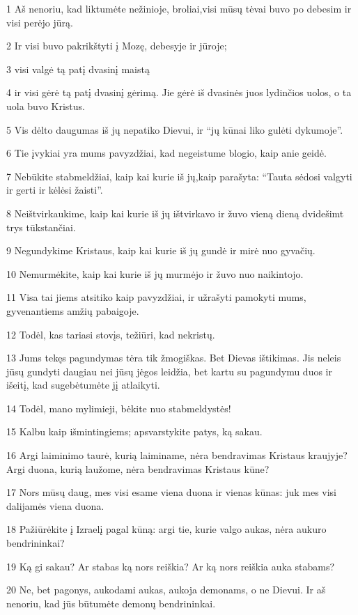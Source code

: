 \par 1 Aš nenoriu, kad liktumėte nežinioje, broliai,­visi mūsų tėvai buvo po debesim ir visi perėjo jūrą. 
\par 2 Ir visi buvo pakrikštyti į Mozę, debesyje ir jūroje; 
\par 3 visi valgė tą patį dvasinį maistą 
\par 4 ir visi gėrė tą patį dvasinį gėrimą. Jie gėrė iš dvasinės juos lydinčios uolos, o ta uola buvo Kristus. 
\par 5 Vis dėlto daugumas iš jų nepatiko Dievui, ir “jų kūnai liko gulėti dykumoje”. 
\par 6 Tie įvykiai yra mums pavyzdžiai, kad negeistume blogio, kaip anie geidė. 
\par 7 Nebūkite stabmeldžiai, kaip kai kurie iš jų,­kaip parašyta: “Tauta sėdosi valgyti ir gerti ir kėlėsi žaisti”. 
\par 8 Neištvirkaukime, kaip kai kurie iš jų ištvirkavo ir žuvo vieną dieną dvidešimt trys tūkstančiai. 
\par 9 Negundykime Kristaus, kaip kai kurie iš jų gundė ir mirė nuo gyvačių. 
\par 10 Nemurmėkite, kaip kai kurie iš jų murmėjo ir žuvo nuo naikintojo. 
\par 11 Visa tai jiems atsitiko kaip pavyzdžiai, ir užrašyti pamokyti mums, gyvenantiems amžių pabaigoje. 
\par 12 Todėl, kas tariasi stovįs, težiūri, kad nekristų. 
\par 13 Jums tekęs pagundymas tėra tik žmogiškas. Bet Dievas ištikimas. Jis neleis jūsų gundyti daugiau nei jūsų jėgos leidžia, bet kartu su pagundymu duos ir išeitį, kad sugebėtumėte jį atlaikyti. 
\par 14 Todėl, mano mylimieji, bėkite nuo stabmeldystės! 
\par 15 Kalbu kaip išmintingiems; apsvarstykite patys, ką sakau. 
\par 16 Argi laiminimo taurė, kurią laiminame, nėra bendravimas Kristaus kraujyje? Argi duona, kurią laužome, nėra bendravimas Kristaus kūne? 
\par 17 Nors mūsų daug, mes visi esame viena duona ir vienas kūnas: juk mes visi dalijamės viena duona. 
\par 18 Pažiūrėkite į Izraelį pagal kūną: argi tie, kurie valgo aukas, nėra aukuro bendrininkai? 
\par 19 Ką gi sakau? Ar stabas ką nors reiškia? Ar ką nors reiškia auka stabams? 
\par 20 Ne, bet pagonys, aukodami aukas, aukoja demonams, o ne Dievui. Ir aš nenoriu, kad jūs būtumėte demonų bendrininkai. 

